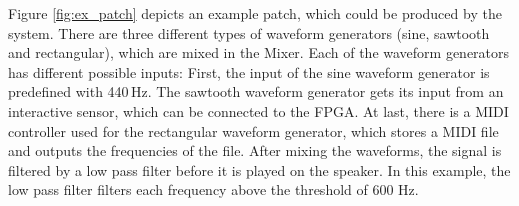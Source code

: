 Figure \ref{fig:ex_patch} depicts an example patch, which could be produced by the system. 
There are three different types of waveform generators (sine, sawtooth and rectangular), which are mixed in the Mixer. 
Each of the waveform generators has different possible inputs: 
First, the input of the sine waveform generator is predefined with 440\,Hz. 
The sawtooth waveform generator gets its input from an interactive sensor, which can be connected to the \ac{FPGA}. 
At last, there is a MIDI controller used for the rectangular waveform generator, which stores a MIDI file and outputs the frequencies of the file.
After mixing the waveforms, the signal is filtered by a low pass filter before it is played on the speaker. In this example, the low pass filter filters each frequency above the threshold of 600 Hz.

%
%
%
%
%
%
